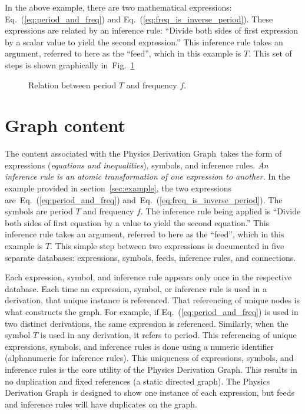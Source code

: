 \documentclass{article}
\newcommand{\eqn}[1]{Eq.\ (\ref{#1})}
\newcommand{\pdg}{Physics Derivation Graph}
\begin{document}
\begin{multicols}{2}
In the above example, there are two mathematical expressions: \eqn{eq:period_and_freq} and \eqn{eq:freq_is_inverse_period}. 
These expressions are related by an inference rule: ``Divide both sides of first expression by a scalar value to yield the second expression.'' 
This inference rule takes an argument, referred to here as the ``feed'', which in this example is $T$. 
This set of steps is shown graphically in~Fig.~\ref{fig:freq_period}

\begin{center}
\begin{figure}
\caption{Relation between period $T$ and frequency $f$.\label{fig:freq_period}}
\end{figure}
\end{center}

\section{Graph content\label{sec:content}}

The content associated with the \pdg\ takes the form of expressions (\textit{equations and inequalities}), symbols, and inference rules. \textit{An inference rule is an atomic transformation of one expression to another.} In the example provided in section~\ref{sec:example}, the two expressions are~\eqn{eq:period_and_freq} and~\eqn{eq:freq_is_inverse_period}. The symbols are period $T$ and frequency $f$. The inference rule being applied is ``Divide both sides of first equation by a value to yield the second equation.'' This inference rule takes an argument, referred to here as the ``feed'', which in this example is $T$. This simple step between two expressions is documented in five separate databases: expressions, symbols, feeds, inference rules, and connections. 

Each expression, symbol, and inference rule appears only once in the respective database. Each time an expression, symbol, or inference rule is used in a derivation, that unique instance is referenced. That referencing of unique nodes is what constructs the graph. For example, if \eqn{eq:period_and_freq} is used in two distinct derivations, the same expression is referenced. Similarly, when the symbol $T$ is used in any derivation, it refers to period. This referencing of unique expressions, symbols, and inference rules is done using a numeric identifier (alphanumeric for inference rules). This uniqueness of expressions, symbols, and inference rules is the core utility of the \pdg. This results in no duplication and fixed references (a static directed graph). The \pdg\ is designed to show one instance of each expression, but feeds and inference rules will have duplicates on the graph. 


\end{multicols}
\end{document}
